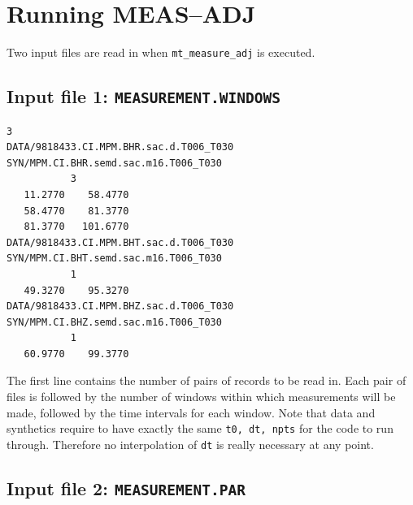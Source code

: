 \documentclass[11pt,titlepage,fleqn]{article}
\begin{document}
\pagebreak
\section{Running MEAS--ADJ}

Two input files are read in when \verb+mt_measure_adj+ is executed.


\subsection{Input file 1: {\tt MEASUREMENT.WINDOWS}}

\begin{verbatim}
3
DATA/9818433.CI.MPM.BHR.sac.d.T006_T030
SYN/MPM.CI.BHR.semd.sac.m16.T006_T030
           3
   11.2770    58.4770
   58.4770    81.3770
   81.3770   101.6770
DATA/9818433.CI.MPM.BHT.sac.d.T006_T030
SYN/MPM.CI.BHT.semd.sac.m16.T006_T030
           1
   49.3270    95.3270
DATA/9818433.CI.MPM.BHZ.sac.d.T006_T030
SYN/MPM.CI.BHZ.semd.sac.m16.T006_T030
           1
   60.9770    99.3770
\end{verbatim}
%
The first line contains the number of pairs of records to be read in.  Each pair of files is followed by the number of windows within which measurements will be made, followed by the time intervals for each window.
Note that data and synthetics require to have exactly the same \verb+t0, dt, npts+ for the code to run through. Therefore
no interpolation of \verb+dt+ is really necessary at any point.


\pagebreak
\subsection{Input file 2: {\tt MEASUREMENT.PAR}}
\end{document}
